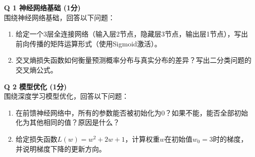 \documentclass[a4paper, 11pt]{article}
\newenvironment{problem}[2][Q]
    { \begin{mdframed}[backgroundcolor=gray!20] \textbf{#1 #2} \\}
    {  \end{mdframed}}
\begin{document}
\begin{CJK}{UTF8}{gbsn}
\begin{problem}{1 神经网络基础 (1分)}
围绕神经网络基础，回答以下问题：
\begin{enumerate}
\item 给定一个3层全连接网络（输入层2节点，隐藏层3节点，输出层1节点），写出前向传播的矩阵运算形式（使用Sigmoid激活）。
\item 交叉熵损失函数如何衡量预测概率分布与真实分布的差异？写出二分类问题的交叉熵公式。
\end{enumerate}
\end{problem}


\begin{problem}{2 模型优化 (1分)}
围绕深度学习模型优化，回答以下问题：
\begin{enumerate}
\item 在前馈神经网络中，所有的参数能否被初始化为0？如果不能，能否全部初始化为其他相同的值？原因是什么？
\item 给定损失函数$L(w)=w^2+2w+1$，计算权重$w$在初始值$w_0=3$时的梯度，并说明梯度下降的更新方向。
\end{enumerate}
\end{problem}





\end{CJK}
\end{document}
